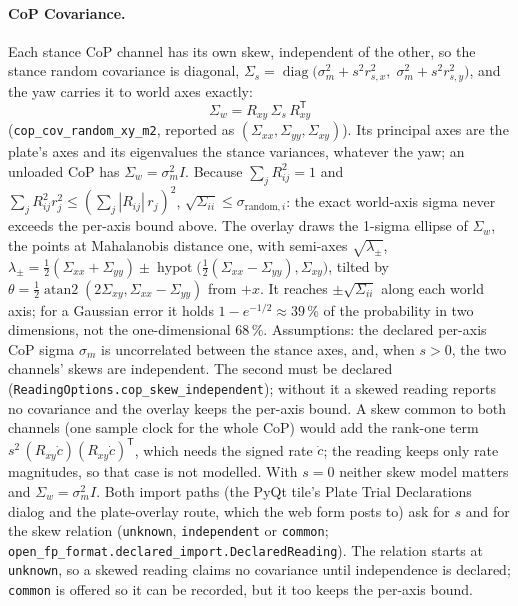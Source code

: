\documentclass[11pt]{article}
\begin{document}
\paragraph{CoP Covariance.} Each stance CoP channel has its own skew,
independent of the other, so the stance random covariance is diagonal,
$\Sigma_s = \operatorname{diag}\bigl(\sigma_m^2 + s^2 r_{s,x}^2,\;
\sigma_m^2 + s^2 r_{s,y}^2\bigr)$, and the yaw carries it to world axes
exactly:
\begin{equation}
  \Sigma_w = R_{xy}\,\Sigma_s\,R_{xy}^{\mathsf T}
\end{equation}
(\texttt{cop\_cov\_random\_xy\_m2}, reported as
$(\Sigma_{xx}, \Sigma_{yy}, \Sigma_{xy})$). Its principal axes are the
plate's axes and its eigenvalues the stance variances, whatever the yaw; an
unloaded CoP has $\Sigma_w = \sigma_m^2 I$. Because
$\sum_j R_{ij}^2 = 1$ and $\sum_j R_{ij}^2 r_j^2 \le (\sum_j |R_{ij}|\,r_j)^2$,
$\sqrt{\Sigma_{ii}} \le \sigma_{\mathrm{random},i}$: the exact world-axis
sigma never exceeds the per-axis bound above. The overlay draws the 1-sigma
ellipse of $\Sigma_w$, the points at Mahalanobis distance one, with
semi-axes $\sqrt{\lambda_\pm}$,
$\lambda_\pm = \tfrac12(\Sigma_{xx}+\Sigma_{yy}) \pm
\operatorname{hypot}\bigl(\tfrac12(\Sigma_{xx}-\Sigma_{yy}), \Sigma_{xy}\bigr)$,
tilted by $\theta = \tfrac12\operatorname{atan2}(2\Sigma_{xy},
\Sigma_{xx}-\Sigma_{yy})$ from $+x$. It reaches $\pm\sqrt{\Sigma_{ii}}$ along
each world axis; for a Gaussian error it holds $1 - e^{-1/2} \approx 39\,\%$
of the probability in two dimensions, not the one-dimensional $68\,\%$.
Assumptions: the declared per-axis CoP sigma $\sigma_m$ is uncorrelated
between the stance axes, and, when $s > 0$, the two channels' skews are
independent. The second must be declared
(\texttt{ReadingOptions.cop\_skew\_independent}); without it a skewed reading
reports no covariance and the overlay keeps the per-axis bound. A skew common
to both channels (one sample clock for the whole CoP) would add the rank-one
term $s^2\,(R_{xy}\dot c)(R_{xy}\dot c)^{\mathsf T}$, which needs the signed
rate $\dot c$; the reading keeps only rate magnitudes, so that case is not
modelled. With $s = 0$ neither skew model matters and $\Sigma_w = \sigma_m^2
I$. Both import paths (the PyQt tile's Plate Trial Declarations dialog and
the plate-overlay route, which the web form posts to) ask for $s$ and for the
skew relation (\texttt{unknown}, \texttt{independent} or \texttt{common};
\texttt{open\_fp\_format.declared\_import.DeclaredReading}). The relation
starts at \texttt{unknown}, so a skewed reading claims no covariance until
independence is declared; \texttt{common} is offered so it can be recorded,
but it too keeps the per-axis bound.
\end{document}
